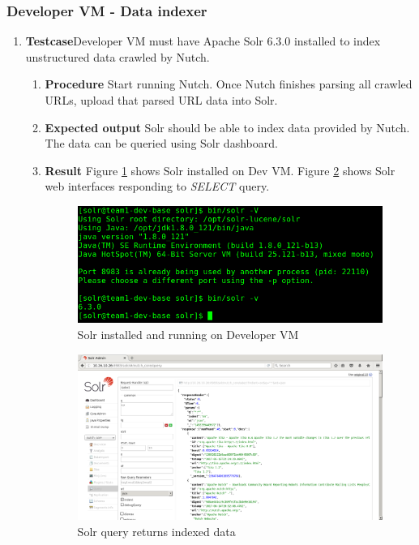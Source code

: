 \subsubsection{Developer VM - Data indexer}
\begin{enumerate}
\item \textbf{Testcase}\newline Developer VM must have Apache Solr
  6.3.0 installed to index unstructured data crawled by Nutch.
  \begin{enumerate}[label={}]
  \item \textbf{Procedure}\newline
    Start running Nutch. Once Nutch finishes parsing all crawled URLs,
    upload that parsed URL data into Solr. 
  \item \textbf{Expected output}\newline
    Solr should be able to index data provided by Nutch. The data can
    be queried using Solr dashboard.
  \item \textbf{Result}\newline
    Figure \ref{solr-version} shows Solr installed on Dev VM. Figure
    \ref{solr-query} shows Solr web interfaces responding to \emph{SELECT} query.
    \begin{figure}
      \centering
      \includegraphics[scale=0.4]{screenshots/solr-version.png}
      \caption{Solr installed and running on Developer VM}
      \label{solr-version}
    \end{figure}
    \begin{figure}
      \centering
      \includegraphics[scale=0.32]{screenshots/solr-query.png}
      \caption{Solr query returns indexed data}
      \label{solr-query}
    \end{figure}
  \end{enumerate}
\end{enumerate}


